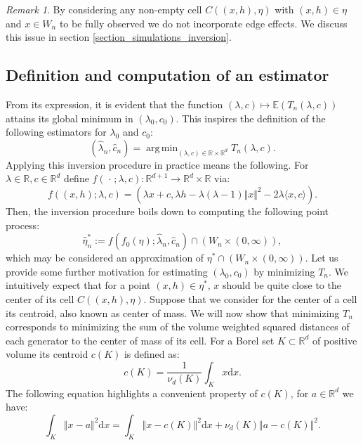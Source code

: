 \documentclass{article}
\newcommand{\RR}{\mathbb{R}}
\newcommand{\EE}{\mathbb{E}}
\newcommand{\blank}{{\mspace{2mu}\cdot\mspace{2mu}}}
\DeclareMathOperator*{\argmin}{arg\,min}
\theoremstyle{plain}
\theoremstyle{remark}
\newtheorem{remark}{Remark}
\theoremstyle{definition}
\begin{document}
\begin{remark}
    By considering any non-empty cell $C((x,h),\eta)$ with $(x,h)\in \eta$ and $x \in W_n$ to be fully observed we do not incorporate edge effects. We discuss this issue in section \ref{section_simulations_inversion}.
\end{remark}

\subsection{Definition and computation of an estimator}\label{section_definition_inversion}
From its expression, it is evident that the function $(\lambda, c) \mapsto \EE\left(T_n(\lambda,c)\right)$ attains its global minimum in $(\lambda_0,c_0)$. This inspires the definition of the following  estimators for $\lambda_0$ and $c_0$:
\[(\hat{\lambda}_n, \hat{c}_n) = \argmin_{(\lambda, c)\in \RR\times\RR^d} T_n(\lambda, c).\]
Applying this inversion procedure in practice means the following. For $\lambda \in \RR, c\in \RR^d$ define $f(\blank;\lambda,c):\RR^{d+1} \to \RR^d\times \RR$ via:
\[f((x,h);\lambda,c) = (\lambda x+c,\lambda h - \lambda(\lambda - 1)\Vert x \Vert^2 - 2\lambda \langle x, c\rangle).\]
Then, the inversion procedure boils down to computing the following point process:
\begin{equation}
    \hat{\eta}_n^* := f(f_0(\eta);\hat{\lambda}_n,\hat{c}_n) \cap (W_n \times(0,\infty)),\label{inversion_point_process}
\end{equation}
which may be considered an approximation of $\eta^* \cap (W_n \times(0,\infty))$. Let us provide some further motivation for estimating $(\lambda_0,c_0)$ by minimizing $T_n$. We intuitively expect that for a point $(x,h) \in \eta^*$, $x$ should be quite close to the center of its cell $C((x,h),\eta)$. Suppose that we consider for the center of a cell its centroid, also known as center of mass. We will now show that minimizing $T_n$ corresponds to minimizing the sum of the volume weighted squared distances of each generator to the center of mass of its cell. For a Borel set $K \subset \RR^d$ of positive volume its centroid $c(K)$ is defined as:
\[c(K) = \frac{1}{\nu_d(K)}\int_K x\mathrm{d}x.\]
The following equation highlights a convenient property of $c(K)$, for $a \in \RR^d$ we have:
\begin{equation}
    \int_K \Vert x - a \Vert^2 \mathrm{d}x = \int_K \Vert x - c(K) \Vert^2 \mathrm{d}x + \nu_d(K)\Vert a - c(K) \Vert^2. \label{centroid_property}
\end{equation}
\end{document}
